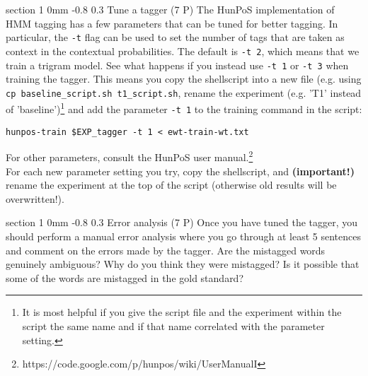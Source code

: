 \documentclass[11pt]{article}
\makeatletter
\newcommand{\newsec}[2]{\section{#1}\label{sec:#2}\noindent}
\renewcommand{\section}{\@startsection
{section}%
{1}%
{0mm}%
{-0.8\baselineskip}%
{0.3\baselineskip}%
{\bfseries\large}}%
\makeatother
\begin{document}
\newsec{Tune a tagger (7 P)}{tune}%
The HunPoS implementation of HMM tagging has a few parameters that can be tuned for better tagging. In particular, the {\tt -t} flag can be used to set the number of
tags that are taken as context in the contextual probabilities. The default is {\tt -t $\!\!$2}, which means that we train a trigram model. See what happens if you instead use {\tt -t $\!\!$1} or
{\tt -t $\!\!$3} when training the tagger. This means you copy the shellscript into a new file (e.g. using \texttt{cp baseline\_script.sh t1\_script.sh}, rename the experiment (e.g. 'T1' instead of 'baseline')\footnote{It is most helpful if you give the script file and the experiment within the script the same name and if that name correlated with the parameter setting.} and add the parameter \texttt{-t 1} to the training command in the script:
\begin{verbatim}
hunpos-train $EXP_tagger -t 1 < ewt-train-wt.txt
\end{verbatim}
For other parameters, consult the HunPoS user manual.\footnote{https://code.google.com/p/hunpos/wiki/UserManualI}\\
For each new parameter setting you try, copy the shellscript, and \textbf{(important!)} rename the experiment at the top of the script (otherwise old results will be overwritten!).

\newsec{Error analysis (7 P)}{error}%
Once you have tuned the tagger, you should perform a manual error analysis where you go through at least 5 sentences and comment on the errors made by the tagger.
Are the mistagged words genuinely ambiguous? Why do you think they were mistagged? Is it possible that some of the words are mistagged in the gold standard?
\end{document}
